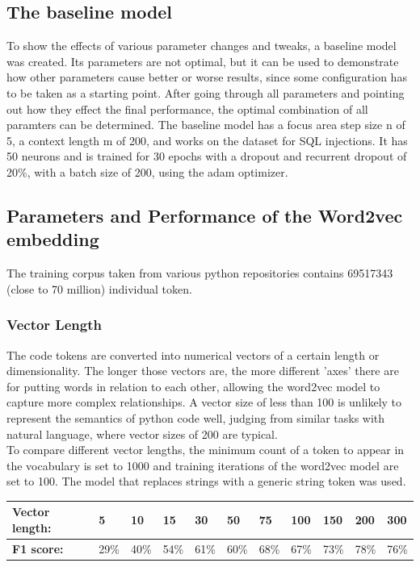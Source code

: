 \documentclass[
	a4paper,
	pagesize,
	pdftex,
	12pt,
	twoside, %
	BCOR=5mm, %
	ngerman,
	fleqn,
	final,
	]{scrartcl}
\begin{document}
\subsection{The baseline model}
To show the effects of various parameter changes and tweaks, a baseline model was created. Its parameters are not optimal, but it can be used to demonstrate how other parameters cause better or worse results, since some configuration has to be taken as a starting point. After going through all parameters and pointing out how they effect the final performance, the optimal combination of all paramters can be determined. The baseline model has a focus area step size n of 5, a context length m of 200, and works on the dataset for SQL injections. It has 50 neurons and is trained for 30 epochs with a dropout and recurrent dropout of 20\%, with a batch size of 200, using the adam optimizer. 

\subsection{Parameters and Performance of the Word2vec embedding}

The training corpus taken from various python repositories contains 69517343 (close to 70 million) individual token.

\subsubsection{Vector Length}
The code tokens are converted into numerical vectors of a certain length or dimensionality. The longer those vectors are, the more different 'axes' there are for putting words in relation to each other, allowing the word2vec model to capture more complex relationships. A vector size of less than 100 is unlikely to represent the semantics of python code well, judging from similar tasks with natural language, where vector sizes of 200 are typical.\\
To compare different vector lengths, the minimum count of a token to appear in the vocabulary is set to 1000 and training iterations of the word2vec model are set to 100. The model that replaces strings with a generic string token was used.



\begin{tabular}{| p{3.5cm}  | p{0.6cm} | p{0.6cm} | p{0.6cm} | p{0.6cm} | p{0.6cm} | p{0.6cm} | p{0.8cm} | p{0.8cm} | p{0.8cm} | p{0.8cm} | }
	\hline
	\textbf{Vector length:} & 5 & 10 & 15 & 30 & 50 & 75 & 100 & 150 & 200 & 300 \\
	\hline
	
	\textbf{F1 score:} & 29\% & 40\% & 54\% & 61\% & 60\% & 68\% & 67\% & 73\% & 78\% & 76\% \\
	\hline
\end{tabular}
\end{document}
